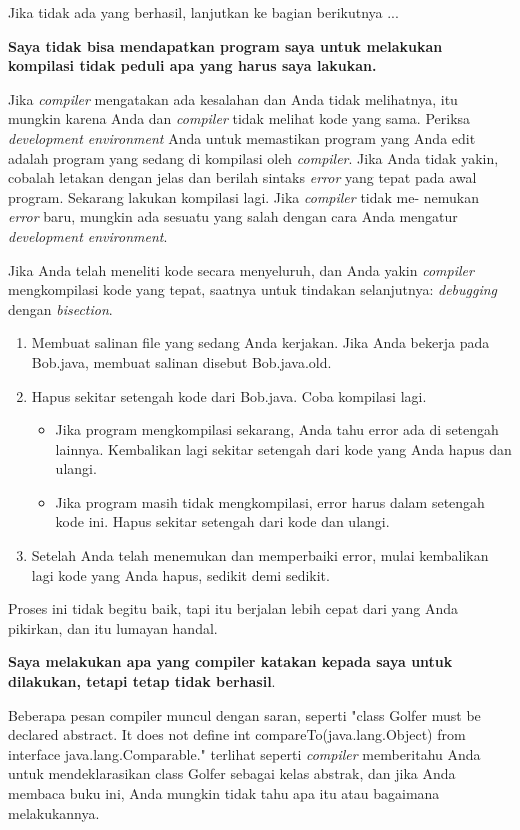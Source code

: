 \noindent Jika tidak ada yang berhasil, lanjutkan ke bagian berikutnya ...

\noindent \textbf{Saya tidak bisa mendapatkan program saya untuk melakukan kompilasi tidak peduli apa yang harus saya lakukan.}

\noindent Jika \textit{compiler} mengatakan ada kesalahan dan Anda tidak melihatnya, itu mungkin karena Anda dan \textit{compiler} tidak melihat kode yang sama. Periksa \textit{development environment} Anda untuk memastikan program yang Anda edit adalah program yang sedang di kompilasi oleh \textit{compiler}. Jika Anda tidak yakin, cobalah letakan dengan jelas dan berilah sintaks \textit{error} yang tepat pada awal program. Sekarang lakukan kompilasi lagi. Jika \textit{compiler} tidak me- nemukan \textit{error} baru, mungkin ada sesuatu yang salah dengan cara Anda mengatur \textit{development environment}.

\noindent Jika Anda telah meneliti kode secara menyeluruh, dan Anda yakin \textit{compiler} mengkompilasi kode yang tepat, saatnya untuk tindakan selanjutnya: \textit{debugging} dengan \textit{bisection}.
\begin{enumerate}
    \item Membuat salinan file yang sedang Anda kerjakan. Jika Anda bekerja pada Bob.java, membuat salinan disebut Bob.java.old.
    \item Hapus sekitar setengah kode dari Bob.java. Coba kompilasi lagi.
    \begin{itemize}
        \item Jika program mengkompilasi sekarang, Anda tahu error ada di setengah lainnya. Kembalikan lagi sekitar setengah dari kode yang Anda hapus dan ulangi.
        \item Jika program masih tidak mengkompilasi, error harus dalam setengah kode ini. Hapus sekitar setengah dari kode dan ulangi.
    \end{itemize}
    \item Setelah Anda telah menemukan dan memperbaiki error, mulai kembalikan lagi kode yang Anda hapus, sedikit demi sedikit.
\end{enumerate}

\noindent Proses ini tidak begitu baik, tapi itu berjalan lebih cepat dari yang Anda pikirkan, dan itu lumayan handal.

\noindent \textbf{Saya melakukan apa yang compiler katakan kepada saya untuk dilakukan, tetapi tetap tidak berhasil}.

\noindent Beberapa pesan compiler muncul dengan saran, seperti "class Golfer must be declared abstract. It does not define int compareTo(java.lang.Object) from interface java.lang.Comparable." terlihat seperti \textit{compiler} memberitahu Anda untuk mendeklarasikan class Golfer sebagai kelas abstrak, dan jika Anda membaca buku ini, Anda mungkin tidak tahu apa itu atau bagaimana melakukannya.

